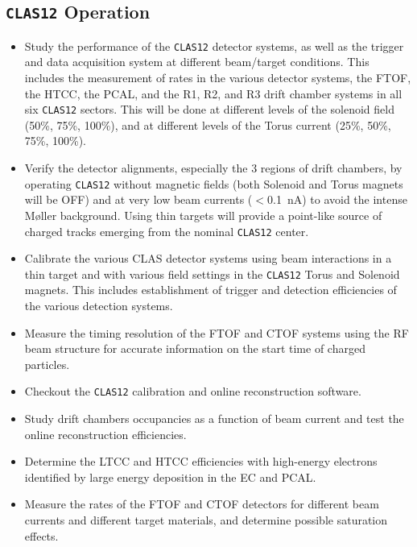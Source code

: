 \subsection{{\tt CLAS12} Operation}

\begin{itemize}

\item Study the performance of the {\tt CLAS12} detector systems, as well 
as the trigger and data acquisition system at different beam/target 
conditions.  This includes the measurement of rates in the various detector 
systems, the FTOF, the HTCC, the PCAL, and the R1, R2, and R3 drift chamber 
systems in all six {\tt CLAS12} sectors. This will be done at different 
levels of the solenoid field (50\%, 75\%, 100\%), and at different levels 
of the Torus current (25\%, 50\%, 75\%, 100\%).   

\item Verify the detector alignments, especially the 3 regions of drift 
chambers, by operating {\tt CLAS12} without magnetic fields (both Solenoid and 
Torus magnets will be OFF) and at very low beam currents ($<$0.1~nA) to 
avoid the intense M{\o}ller background.  Using thin targets will provide a 
point-like source of charged tracks emerging from the nominal {\tt CLAS12} 
center. 

\item Calibrate the various CLAS detector systems using beam interactions in 
a thin target and with various field settings in the {\tt CLAS12} Torus and 
Solenoid magnets.  This includes establishment of trigger and detection 
efficiencies of the various detection systems.

\item Measure the timing resolution of the FTOF and CTOF systems using the 
RF beam structure for accurate information on the start time of charged 
particles. 

\item Checkout the {\tt CLAS12} calibration and online reconstruction 
software. 

\item Study drift chambers occupancies as a function of beam current and 
test the online reconstruction efficiencies. 

\item Determine the LTCC and HTCC efficiencies with high-energy electrons 
identified by large energy deposition in the EC and PCAL.  

\item Measure the rates of the FTOF and CTOF detectors for different beam 
currents and different target materials, and determine possible saturation 
effects.  

\end{itemize}



